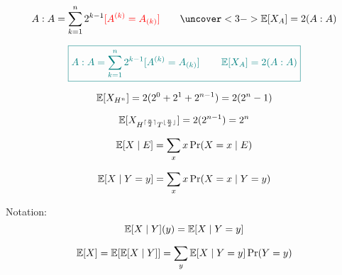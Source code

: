 \begin{frame}{}
  \[
    A : A = \sum_{k=1}^{n} 2^{k-1} \red{[A^{(k)} = A_{(k)}]} \qquad \uncover<3->{\E[X_{A}] = 2 (A : A)}
  \]

  \pause
  \vspace{-0.30cm}

\end{frame}

\begin{frame}{}
  \[
    \textcolor{teal}{\boxed{A : A = \sum_{k=1}^{n} 2^{k-1} [A^{(k)} = A_{(k)}] \qquad \operatorname*{\mathbb{E}}[X_{A}] = 2 (A : A)}}
  \]

  \pause
  \vspace{0.80cm}
  \[
    \operatorname*{\mathbb{E}}[X_{H^n}] = 2(2^0 + 2^1 + 2^{n-1}) = 2(2^n - 1)
  \]

  \pause
  \vspace{0.30cm}
  \[
    \operatorname*{\mathbb{E}}[X_{H^{\lceil \frac{n}{2} \rceil} T^{\lfloor \frac{n}{2} \rfloor}}] = 2(2^{n-1}) = 2^n
  \]
\end{frame}

\begin{frame}{}
  \begin{definition}
    \[
      \operatorname*{\mathbb{E}}[X \mid E] = \sum_{x} x \Pr(X = x \mid E)
    \]
  \end{definition}

  \pause
  \begin{definition}
    \[
      \operatorname*{\mathbb{E}}[X \mid Y = y] = \sum_{x} x \Pr(X = x \mid Y = y)
    \]
  \end{definition}

  \pause
  \begin{alertblock}{Notation:}
    \[
      \operatorname*{\mathbb{E}}[X \mid Y](y) = \operatorname*{\mathbb{E}}[X \mid Y = y]
    \]
  \end{alertblock}

  \pause
  \begin{theorem}
    \[
      \operatorname*{\mathbb{E}}[X] = \operatorname*{\mathbb{E}}[\operatorname*{\mathbb{E}}[X \mid Y]] = \sum_{y} \operatorname*{\mathbb{E}}[X \mid Y = y] \Pr(Y = y)
    \]
  \end{theorem}
\end{frame}
